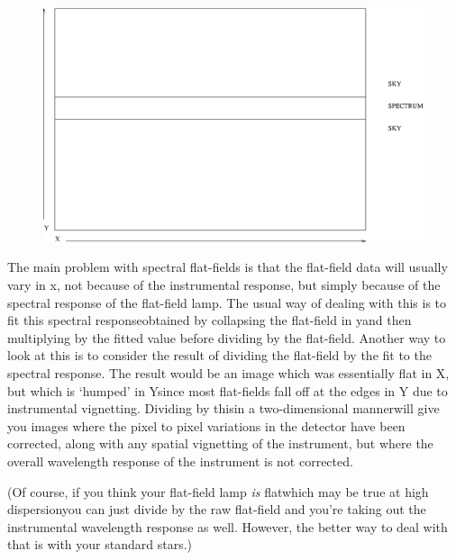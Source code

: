 \begin{latexonly}
\begin{figure}[htb]
\begin{center}
\includegraphics{sun86_2df.eps}
\end{center}
\end{figure}
\end{latexonly}

   The main problem with spectral flat-fields is that the flat-field
   data will usually vary in x, not because of the instrumental
   response, but simply because of the spectral response of the
   flat-field lamp.  The usual way of dealing with this is to fit this
   spectral response\latorhtm{---}{-}obtained by collapsing the flat-field in
   y\latorhtm{---}{-}and then multiplying by the fitted value before dividing
   by the flat-field.  Another way to look at this is to consider the result of
   dividing the flat-field by the fit to the spectral response.  The
   result would be an image which was essentially flat in X, but which
   is `humped' in Y\latorhtm{---}{-}since most flat-fields fall off at the
   edges in Y due to instrumental vignetting.  Dividing by
   this\latorhtm{---}{-}in a two-dimensional manner\latorhtm{---}{-}will give
   you images where the pixel to
   pixel variations in the detector have been corrected, along with any
   spatial vignetting of the instrument, but where the overall
   wavelength response of the instrument is not corrected.

   (Of course, if you think your flat-field lamp {\em is\/}
   flat\latorhtm{---}{-}which may be true at high
   dispersion\latorhtm{---}{-}you can just divide by
   the raw flat-field and you're taking out the instrumental wavelength
   response as well.  However, the better way to deal with that is with
   your standard stars.)

